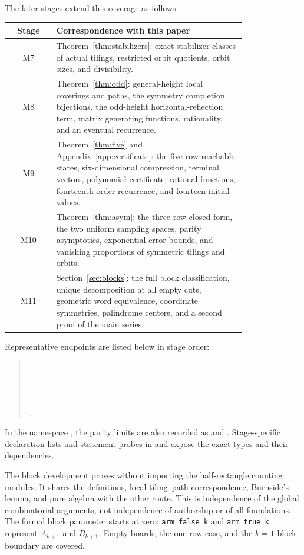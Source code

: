 The later stages extend this coverage as follows.
\begin{center}
\small
\begin{tabular}{cp{0.80\linewidth}}
\toprule
Stage & Correspondence with this paper\\
\midrule
M7 & Theorem~\ref{thm:stabilizers}: exact stabilizer classes of actual
tilings, restricted orbit quotients, orbit sizes, and divisibility.\\
M8 & Theorem~\ref{thm:odd}: general-height local coverings and paths,
the symmetry completion bijections, the odd-height horizontal-reflection
term, matrix generating functions, rationality, and an eventual recurrence.\\
M9 & Theorem~\ref{thm:five} and Appendix~\ref{app:certificate}: the five-row
reachable states, six-dimensional compression, terminal vectors,
polynomial certificate, rational functions, fourteenth-order recurrence,
and fourteen initial values.\\
M10 & Theorem~\ref{thm:asym}: the three-row closed form, the two uniform
sampling spaces, parity asymptotics, exponential error bounds, and
vanishing proportions of symmetric tilings and orbits.\\
M11 & Section~\ref{sec:blocks}: the full block classification, unique
decomposition at all empty cuts, geometric word equivalence, coordinate
symmetries, palindrome centers, and a second proof of the main series.\\
\bottomrule
\end{tabular}
\end{center}

Representative endpoints are listed below in stage order:
\begin{quote}\small
{}\\
\\
\\
\\
.
\end{quote}
In the namespace , the parity limits are
also recorded as  and
.
Stage-specific declaration lists and statement probes in
 and  expose the exact types
and their dependencies.

The block development proves
 without importing the
half-rectangle counting modules. It shares the definitions, local
tiling--path correspondence, Burnside's lemma, and pure algebra with the
other route. This is independence of the global combinatorial arguments,
not independence of authorship or of all foundations.
The formal block parameter starts at zero: \texttt{arm false k} and
\texttt{arm true k} represent $A_{k+1}$ and $B_{k+1}$.
Empty boards, the one-row case, and the $k=1$ block boundary are covered.

